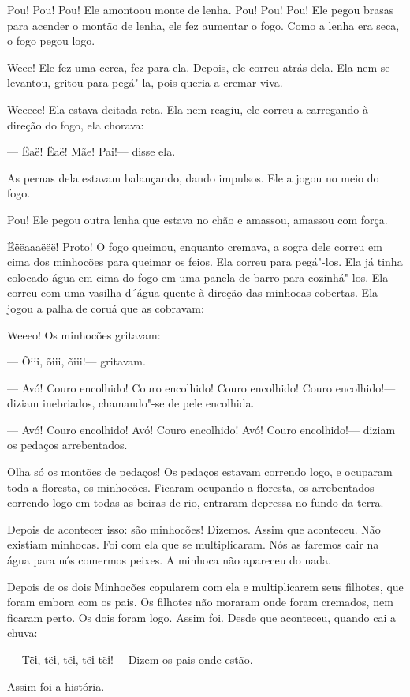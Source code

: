 Pou! Pou! Pou! Ele amontoou monte de lenha. Pou! Pou! Pou! Ele pegou
brasas para acender o montão de lenha, ele fez aumentar o fogo. Como a
lenha era seca, o fogo pegou logo. 

Weee! Ele fez uma cerca, fez para ela. Depois, ele correu atrás dela.
Ela nem se levantou, gritou para pegá"-la, pois queria a cremar viva. 

Weeeee! Ela estava deitada reta. Ela nem reagiu, ele correu a carregando
à direção do fogo, ela chorava: 

--- Ëaë! Ëaë! Mãe! Pai!--- disse ela. 

As pernas dela estavam balançando, dando impulsos. Ele a jogou no meio
do fogo. 

Pou! Ele pegou outra lenha que estava no chão e amassou, amassou com
força. 

Ëëëaaaëëë! Proto! O fogo queimou, enquanto cremava, a sogra dele correu
em cima dos minhocões para queimar os feios. Ela correu para pegá"-los.
Ela já tinha colocado água em cima do fogo em uma panela de barro para
cozinhá"-los. Ela correu com uma vasilha d´água quente à direção das
minhocas cobertas. Ela jogou a palha de coruá que as cobravam: 

Weeeo! Os minhocões gritavam:

--- Õiii, õiii, õiii!--- gritavam. 

--- Avó! Couro encolhido! Couro encolhido! Couro encolhido! Couro
encolhido!--- diziam inebriados, chamando"-se de pele encolhida. 

--- Avó! Couro encolhido! Avó! Couro encolhido! Avó! Couro encolhido!---
diziam os pedaços arrebentados. 

Olha só os montões de pedaços! Os pedaços estavam correndo logo, e
ocuparam toda a floresta, os minhocões. Ficaram ocupando a floresta, os
arrebentados correndo logo em todas as beiras de rio, entraram depressa
no fundo da terra. 

Depois de acontecer isso: são minhocões! Dizemos. Assim que aconteceu.
Não existiam minhocas. Foi com ela que se multiplicaram. Nós as faremos
cair na água para nós comermos peixes. A minhoca não apareceu do nada. 

Depois de os dois Minhocões copularem com ela e multiplicarem seus
filhotes, que foram embora com os pais. Os filhotes não moraram onde
foram cremados, nem ficaram perto. Os dois foram logo. Assim foi. Desde
que aconteceu, quando cai a chuva:

--- Tëɨ, tëɨ, tëɨ, tëɨ tëɨ!--- Dizem os pais onde estão. 

Assim foi a história.

 

 
